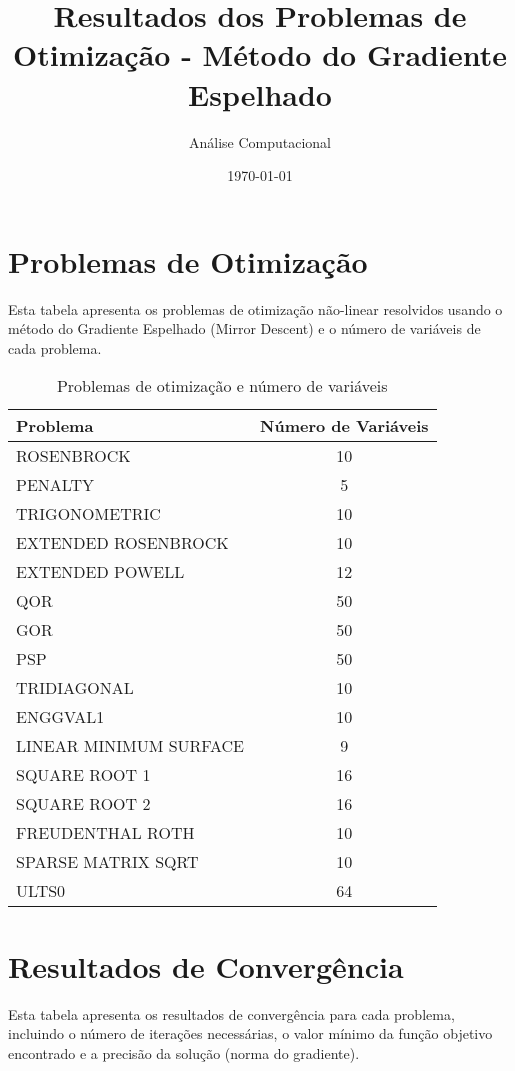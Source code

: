 \documentclass[12pt]{article}
\title{Resultados dos Problemas de Otimização - Método do Gradiente Espelhado}
\author{Análise Computacional}
\date{\today}
\begin{document}
\maketitle

\section{Problemas de Otimização}

Esta tabela apresenta os problemas de otimização não-linear resolvidos usando o método do Gradiente Espelhado (Mirror Descent) e o número de variáveis de cada problema.

\begin{table}[h!]
\centering
\caption{Problemas de otimização e número de variáveis}
\label{tab:problemas_variáveis}
\begin{tabular}{@{}lc@{}}
\toprule
\textbf{Problema} & \textbf{Número de Variáveis} \\
\midrule
ROSENBROCK & 10 \\
PENALTY & 5 \\
TRIGONOMETRIC & 10 \\
EXTENDED ROSENBROCK & 10 \\
EXTENDED POWELL & 12 \\
QOR & 50 \\
GOR & 50 \\
PSP & 50 \\
TRIDIAGONAL & 10 \\
ENGGVAL1 & 10 \\
LINEAR MINIMUM SURFACE & 9 \\
SQUARE ROOT 1 & 16 \\
SQUARE ROOT 2 & 16 \\
FREUDENTHAL ROTH & 10 \\
SPARSE MATRIX SQRT & 10 \\
ULTS0 & 64 \\
\bottomrule
\end{tabular}
\end{table}

\section{Resultados de Convergência}

Esta tabela apresenta os resultados de convergência para cada problema, incluindo o número de iterações necessárias, o valor mínimo da função objetivo encontrado e a precisão da solução (norma do gradiente).
\end{document}
